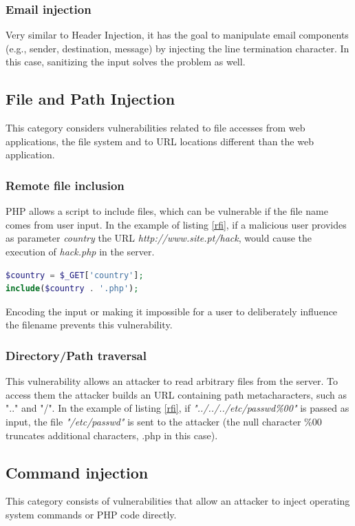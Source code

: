 \subsubsection{Email injection} Very similar to Header Injection, it has the goal to manipulate email components (e.g., sender, destination, message) by injecting the line termination character. In this case, sanitizing the input solves the problem as well.

\subsection{File and Path Injection} This category considers vulnerabilities related to file accesses from web applications, the file system and to URL locations different than the web application.

\subsubsection{Remote file inclusion} PHP allows a script to include files, which can be vulnerable if the file name comes from user input. In the example of listing \ref{rfi}, if a malicious user provides as parameter \textit{country} the URL \textit{http://www.site.pt/hack}, would cause the execution of \textit{hack.php} in the server.  


\begin{lstlisting}[language=PHP,showstringspaces=false, caption={PHP script vulnerable to remote file inclusion},label=rfi,captionpos=b]
$country = $_GET['country'];
include($country . '.php');
\end{lstlisting}

Encoding the input or making it impossible for a user to deliberately influence the filename prevents this vulnerability.

\subsubsection{Directory/Path traversal} This vulnerability allows an attacker to read arbitrary files from the server. To access them the attacker builds an URL containing path metacharacters, such as ".." and "/". In the example of listing \ref{rfi}, if \textit{"../../../etc/passwd\%00"} is passed as input, the file \textit{"/etc/passwd"} is sent to the attacker  (the null character \%00 truncates additional characters, .php in this case).

\subsection{Command injection} 
This category consists of vulnerabilities that allow an attacker to inject operating system commands or PHP code directly. 

